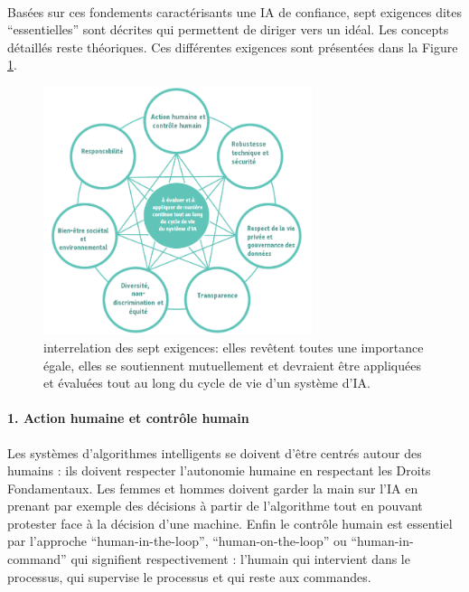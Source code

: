 \documentclass[10pt, french, a4paper]{report}
\begin{document}
\paragraph{}
Basées sur ces fondements caractérisants une IA de confiance, sept exigences dites ``essentielles'' sont décrites qui permettent de diriger vers un idéal. Les concepts détaillés reste théoriques. Ces différentes exigences sont présentées dans la Figure \ref{fig:7_exigences}.

\begin{figure}[hbt!]
  \centering
  \includegraphics[width=0.7\textwidth]{images/7_exigences_commission.png}
  \caption{interrelation des sept exigences: elles revêtent toutes une importance égale, elles se soutiennent mutuellement et devraient être appliquées et évaluées tout au long du cycle de vie d’un système d’IA. \citep{commission_europeenne_ethics_2019}}
  \label{fig:7_exigences}
\end{figure}

\paragraph{1. Action humaine et contrôle humain} Les systèmes d'algorithmes intelligents se doivent d'être centrés autour des humains : ils doivent respecter l'autonomie humaine en respectant les Droits Fondamentaux. Les femmes et hommes doivent garder la main sur l'IA en prenant par exemple des décisions à partir de l'algorithme tout en pouvant protester face à la décision d'une machine. Enfin le contrôle humain est essentiel par l'approche ``human-in-the-loop'', ``human-on-the-loop'' ou ``human-in-command'' qui signifient respectivement : l'humain qui intervient dans le processus, qui supervise le processus et qui reste aux commandes. 
\end{document}
